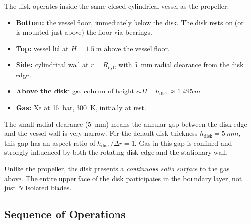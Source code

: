 \documentclass[11pt,a4paper]{article}
\begin{document}
The disk operates inside the same closed cylindrical vessel as the
propeller:
\begin{itemize}
  \item \textbf{Bottom:} the vessel floor, immediately below the disk.
        The disk rests on (or is mounted just above) the floor via
        bearings.
  \item \textbf{Top:} vessel lid at $H = \SI{1.5}{m}$ above the
        vessel floor.
  \item \textbf{Side:} cylindrical wall at $r = R_\mathrm{cyl}$, with
        \SI{5}{mm} radial clearance from the disk edge.
  \item \textbf{Above the disk:} gas column of height
        $\sim H - h_\mathrm{disk} \approx \SI{1.495}{m}$.
  \item \textbf{Gas:} Xe at \SI{15}{bar}, \SI{300}{K}, initially at
        rest.
\end{itemize}

The small radial clearance (\SI{5}{mm}) means the annular gap between
the disk edge and the vessel wall is very narrow. For the default disk
thickness $h_\mathrm{disk} = \SI{5}{mm}$, this gap has an aspect ratio
of $h_\mathrm{disk}/\Delta r = 1$. Gas in this gap is confined and
strongly influenced by both the rotating disk edge and the stationary
wall.

Unlike the propeller, the disk presents a \emph{continuous solid
surface} to the gas above. The entire upper face of the disk
participates in the boundary layer, not just $N$ isolated blades.

\subsection{Sequence of Operations}
\end{document}
